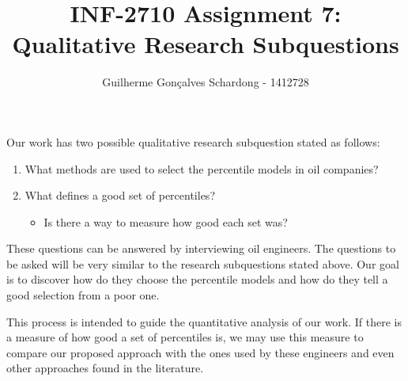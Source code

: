 \documentclass[]{article}
\title{INF-2710 Assignment 7: Qualitative Research Subquestions}
\author{Guilherme Gon\c{c}alves Schardong - 1412728}
\begin{document}
\maketitle

Our work has two possible qualitative research subquestion stated as follows:
\begin{enumerate}
\item What methods are used to select the percentile models in oil companies?
\item What defines a good set of percentiles?
  \begin{itemize}
  \item Is there a way to measure how good each set was?
  \end{itemize}
\end{enumerate}

These questions can be answered by interviewing oil engineers. The questions to be asked will be very similar to the research subquestions stated above. Our goal is to discover how do they choose the percentile models and how do they tell a good selection from a poor one.

This process is intended to guide the quantitative analysis of our work. If there is a measure of how good a set of percentiles is, we may use this measure to compare our proposed approach with the ones used by these engineers and even other approaches found in the literature.
\end{document}
